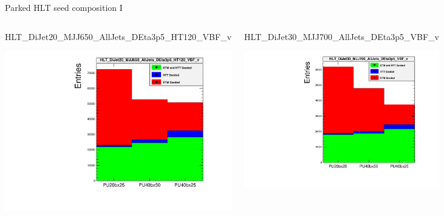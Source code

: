 \documentclass[8pt]{beamer}
\begin{document}
% 

\begin{frame}{Parked HLT seed composition I}

\begin{columns}
 
\begin{block}{\footnotesize HLT\_DiJet20\_MJJ650\_AllJets\_DEta3p5\_HT120\_VBF\_v}
\centering

\includegraphics[width=\linewidth]{fig/HLT_DiJet20_MJJ650_AllJets_DEta3p5_HT120_VBF_v.pdf}

\end{block}
  
\begin{block}{\footnotesize HLT\_DiJet30\_MJJ700\_AllJets\_DEta3p5\_VBF\_v}
\centering

\includegraphics[width=\linewidth]{fig/HLT_DiJet30_MJJ700_AllJets_DEta3p5_VBF_v.pdf}

\end{block}

\end{columns}

\end{frame}
\end{document}
